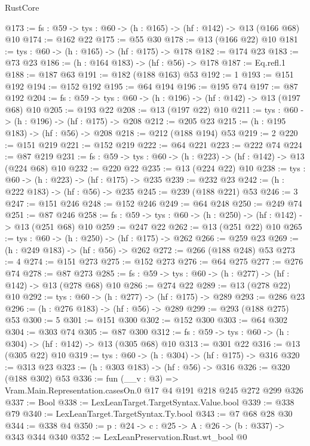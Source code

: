 \begin{lexlean}{RustCore}
\begin{coremodule}
@173 := {fs : @59} -> {tys : @60} -> (h : @165) -> (hf : @142) -> @13 (@166 @68) @10
@174 := @162 @22
@175 := @55 @30
@178 := @13 (@166 @22) @10
@181 := {tys : @60} -> (h : @165) -> (hf : @175) -> @178
@182 := @174 @23
@183 := @73 @23
@186 := (h : @164 @183) -> (hf : @56) -> @178
@187 := Eq.refl.{1}
@188 := @187 @63
@191 := @182 (@188 @163) @53
@192 := 1
@193 := @151 @192
@194 := @152 @192
@195 := @64 @194
@196 := @195 @74
@197 := @87 @192
@204 := {fs : @59} -> {tys : @60} -> (h : @196) -> (hf : @142) -> @13 (@197 @68) @10
@205 := @193 @22
@208 := @13 (@197 @22) @10
@211 := {tys : @60} -> (h : @196) -> (hf : @175) -> @208
@212 := @205 @23
@215 := (h : @195 @183) -> (hf : @56) -> @208
@218 := @212 (@188 @194) @53
@219 := 2
@220 := @151 @219
@221 := @152 @219
@222 := @64 @221
@223 := @222 @74
@224 := @87 @219
@231 := {fs : @59} -> {tys : @60} -> (h : @223) -> (hf : @142) -> @13 (@224 @68) @10
@232 := @220 @22
@235 := @13 (@224 @22) @10
@238 := {tys : @60} -> (h : @223) -> (hf : @175) -> @235
@239 := @232 @23
@242 := (h : @222 @183) -> (hf : @56) -> @235
@245 := @239 (@188 @221) @53
@246 := 3
@247 := @151 @246
@248 := @152 @246
@249 := @64 @248
@250 := @249 @74
@251 := @87 @246
@258 := {fs : @59} -> {tys : @60} -> (h : @250) -> (hf : @142) -> @13 (@251 @68) @10
@259 := @247 @22
@262 := @13 (@251 @22) @10
@265 := {tys : @60} -> (h : @250) -> (hf : @175) -> @262
@266 := @259 @23
@269 := (h : @249 @183) -> (hf : @56) -> @262
@272 := @266 (@188 @248) @53
@273 := 4
@274 := @151 @273
@275 := @152 @273
@276 := @64 @275
@277 := @276 @74
@278 := @87 @273
@285 := {fs : @59} -> {tys : @60} -> (h : @277) -> (hf : @142) -> @13 (@278 @68) @10
@286 := @274 @22
@289 := @13 (@278 @22) @10
@292 := {tys : @60} -> (h : @277) -> (hf : @175) -> @289
@293 := @286 @23
@296 := (h : @276 @183) -> (hf : @56) -> @289
@299 := @293 (@188 @275) @53
@300 := 5
@301 := @151 @300
@302 := @152 @300
@303 := @64 @302
@304 := @303 @74
@305 := @87 @300
@312 := {fs : @59} -> {tys : @60} -> (h : @304) -> (hf : @142) -> @13 (@305 @68) @10
@313 := @301 @22
@316 := @13 (@305 @22) @10
@319 := {tys : @60} -> (h : @304) -> (hf : @175) -> @316
@320 := @313 @23
@323 := (h : @303 @183) -> (hf : @56) -> @316
@326 := @320 (@188 @302) @53
@336 := fun (__v : @3) => Vram.Main.Representation.casesOn.{0} @17 @4 @191 @218 @245 @272 @299 @326
@337 := Bool
@338 := LexLeanTarget.TargetSyntax.Value.bool
@339 := @338 @79
@340 := LexLeanTarget.TargetSyntax.Ty.bool
@343 := @7 @68 @28 @30
@344 := @338 @4
@350 := {p : @24} -> {c : @25} -> {A : @26} -> (b : @337) -> @343 @344 @340
@352 := LexLeanPreservation.Rust.wt_bool @0

\end{coremodule}
\end{lexlean}
